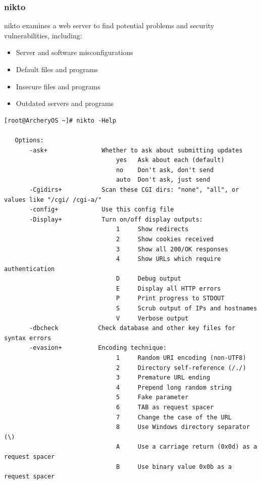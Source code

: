 \documentclass{article}
\begin{document}
\subsubsection{nikto}
nikto examines a web server to find potential problems and security vulnerabilities, including:
\begin{itemize}
	\item Server and software misconfigurations
	\item Default files and programs
	\item Insecure files and programs
	\item Outdated servers and programs
\end{itemize}
\begin{lstlisting}
[root@ArcheryOS ~]# nikto -Help

   Options:
       -ask+               Whether to ask about submitting updates
                               yes   Ask about each (default)
                               no    Don't ask, don't send
                               auto  Don't ask, just send
       -Cgidirs+           Scan these CGI dirs: "none", "all", or values like "/cgi/ /cgi-a/"
       -config+            Use this config file
       -Display+           Turn on/off display outputs:
                               1     Show redirects
                               2     Show cookies received
                               3     Show all 200/OK responses
                               4     Show URLs which require authentication
                               D     Debug output
                               E     Display all HTTP errors
                               P     Print progress to STDOUT
                               S     Scrub output of IPs and hostnames
                               V     Verbose output
       -dbcheck           Check database and other key files for syntax errors
       -evasion+          Encoding technique:
                               1     Random URI encoding (non-UTF8)
                               2     Directory self-reference (/./)
                               3     Premature URL ending
                               4     Prepend long random string
                               5     Fake parameter
                               6     TAB as request spacer
                               7     Change the case of the URL
                               8     Use Windows directory separator (\)
                               A     Use a carriage return (0x0d) as a request spacer
                               B     Use binary value 0x0b as a request spacer

\end{lstlisting}
\end{document}
